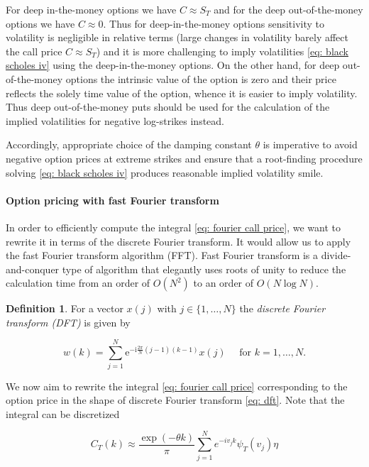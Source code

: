 \documentclass[12pt,twoside]{article}
\theoremstyle{plain}
\theoremstyle{plain}
\theoremstyle{definition}
\newtheorem{definition}[proposition]{Definition}
\theoremstyle{remark}
\numberwithin{equation}{section}
\begin{document}
For deep in-the-money options we have $C\approx S_T$ and for the deep out-of-the-money options we have $C\approx 0$. Thus for deep-in-the-money options sensitivity to volatility is negligible in relative terms (large changes in volatility barely affect the call price $C\approx S_T$) and it is more challenging to imply volatilities \eqref{eq: black scholes iv} using the deep-in-the-money options. On the other hand, for deep out-of-the-money options the intrinsic value of the option is zero and their price reflects the solely time value of the option, whence it is easier to imply volatility. Thus deep out-of-the-money puts should be used for the calculation of the implied volatilities for negative log-strikes instead.

Accordingly, appropriate choice of the damping constant $\theta$ is imperative to avoid negative option prices at extreme strikes and ensure that a root-finding procedure solving \eqref{eq: black scholes iv} produces reasonable implied volatility smile.

\paragraph{Option pricing with fast Fourier transform}

In order to efficiently compute the integral \eqref{eq: fourier call price}, we want to rewrite it in terms of the discrete Fourier transform. It would allow us to apply the fast Fourier transform algorithm (FFT). Fast Fourier transform is a divide-and-conquer type of algorithm that elegantly uses roots of unity to reduce the calculation time from an order of $O(N^2)$ to an order of $O(N\log N)$.

\begin{definition}
For a vector $x(j)$ with $j \in \{1, \dots, N\}$ the \emph{discrete Fourier transform (DFT)} is given by

\begin{equation}
\label{eq: dft}    
w(k)=\sum_{j=1}^{N} \mathrm{e}^{-\mathrm{i} \frac{2 \pi}{N}(j-1)(k-1)} x(j) \quad \text { for } k=1, \ldots, N.
\end{equation}

\end{definition}

We now aim to rewrite the integral \eqref{eq: fourier call price} corresponding to the option price in the shape of discrete Fourier transform \eqref{eq: dft}. Note that the integral can be discretized

$$
C_{T}(k) \approx \frac{\exp (-\theta k)}{\pi} \sum_{j=1}^{N} e^{-i v_{j} k} \psi_{T}\left(v_{j}\right) \eta
$$
\end{document}
